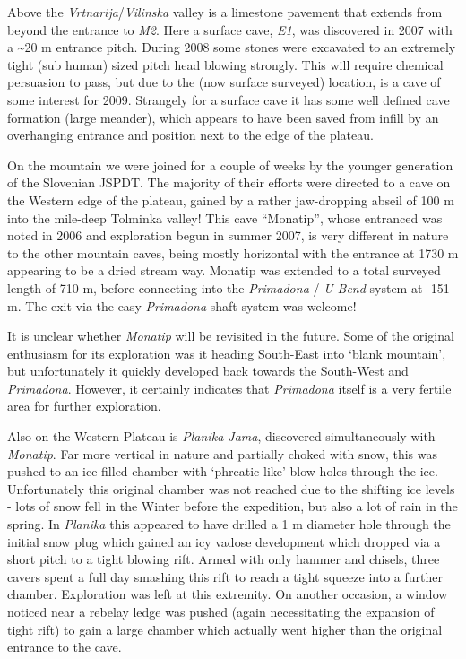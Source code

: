 Above the \emph{Vrtnarija}/\emph{Vilinska} valley is a limestone
pavement that extends from beyond the entrance to \emph{M2}. Here a
surface cave, \emph{E1}, was discovered in 2007 with a \textasciitilde20
m entrance pitch. During 2008 some stones were excavated to an extremely
tight (sub human) sized pitch head blowing strongly. This will require
chemical persuasion to pass, but due to the (now surface surveyed)
location, is a cave of some interest for 2009. Strangely for a surface
cave it has some well defined cave formation (large meander), which
appears to have been saved from infill by an overhanging entrance and
position next to the edge of the plateau.

On the mountain we were joined for a couple of weeks by the younger
generation of the Slovenian JSPDT. The majority of their efforts were
directed to a cave on the Western edge of the plateau, gained by a
rather jaw-dropping abseil of 100 m into the mile-deep Tolminka valley!
This cave ``Monatip'', whose entranced was noted in 2006 and exploration
begun in summer 2007, is very different in nature to the other mountain
caves, being mostly horizontal with the entrance at 1730 m appearing to
be a dried stream way. Monatip was extended to a total surveyed length
of 710 m, before connecting into the \emph{Primadona} / \emph{U-Bend}
system at -151 m. The exit via the easy \emph{Primadona} shaft system
was welcome!

It is unclear whether \emph{Monatip} will be revisited in the future.
Some of the original enthusiasm for its exploration was it heading
South-East into `blank mountain', but unfortunately it quickly developed
back towards the South-West and \emph{Primadona}. However, it certainly
indicates that \emph{Primadona} itself is a very fertile area for
further exploration.

Also on the Western Plateau is \emph{Planika Jama}, discovered
simultaneously with \emph{Monatip}. Far more vertical in nature and
partially choked with snow, this was pushed to an ice filled chamber
with `phreatic like' blow holes through the ice. Unfortunately this
original chamber was not reached due to the shifting ice levels - lots
of snow fell in the Winter before the expedition, but also a lot of rain
in the spring. In \emph{Planika} this appeared to have drilled a 1 m
diameter hole through the initial snow plug which gained an icy vadose
development which dropped via a short pitch to a tight blowing rift.
Armed with only hammer and chisels, three cavers spent a full day
smashing this rift to reach a tight squeeze into a further chamber.
Exploration was left at this extremity. On another occasion, a window
noticed near a rebelay ledge was pushed (again necessitating the
expansion of tight rift) to gain a large chamber which actually went
higher than the original entrance to the cave.

